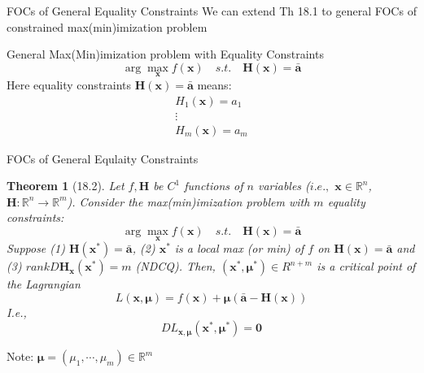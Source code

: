\documentclass[a4paper,11pt]{article}
\newtheorem{thm}{Theorem}
\newcommand{\bb}{\mathbb}
\newcommand{\bd}{\mathbf}
\begin{document}
\begin{frame}[t]{FOCs of General Equality Constraints}
	We can extend Th 18.1 to general FOCs of constrained max(min)imization problem
	\begin{block}
		{General Max(Min)imization problem with Equality Constraints}
		\[
				\arg\max_{\bd{x}} f(\bd{x}) \quad s.t. \quad \bd{H}(\bd{x})=\bar{\bd{a}}
			\]
			Here equality constraints $\bd{H}(\bd{x})=\bar{\bd{a}}$ means:\[
				\begin{matrix}
					H_1(\bd{x})=a_1 \\
					\vdots\\
					H_m(\bd{x})=a_m
				\end{matrix}
			\]
	\end{block}

\end{frame}
\begin{frame}[t]{FOCs of General Equlaity Constraints}
	\begin{thm}
		[18.2] Let $f,\bd{H}$ be $C^1$ functions of $n$ variables ($i.e.,$ $\bd{x}\in\bb{R}^n$, $\bd{H}:\bb{R}^n\rightarrow\bb{R}^m$). Consider the max(min)imization problem with $m$ equality constraints:\[
			\arg\max_{\bd{x}} f(\bd{x}) \quad s.t.\quad \bd{H}(\bd{x})=\bar{\bd{a}}
		\]Suppose (1) $\bd{H}(\bd{x^\ast})=\bar{\bd{a}}$, (2) $\bd{x^\ast}$ is a local max (or min) of $f$ on $\bd{H}(\bd{x})=\bar{\bd{a}}$ and (3) $rank D\bd{H}_{\bd{x} }(\bd{x^\ast})=m$ (NDCQ). Then, $(\bd{x^\ast},\bd{\mu^\ast})\in{R}^{n+m}$ is a critical point of the Lagrangian\[
			L(\bd{x},\bd{\mu})=f(\bd{x})+\bd{\mu}(\bar{\bd{a}}-\bd{H}(\bd{x}))
		\]I.e.,\[
			DL_{\bd{x},\bd{\mu}}(\bd{x^\ast},\bd{\mu^\ast}) = \bd{0}
		\]
	\end{thm}
	Note: $\bd{\mu}=(\mu_1,\cdots,\mu_m)\in\bb{R}^m$
\end{frame}
\end{document}
